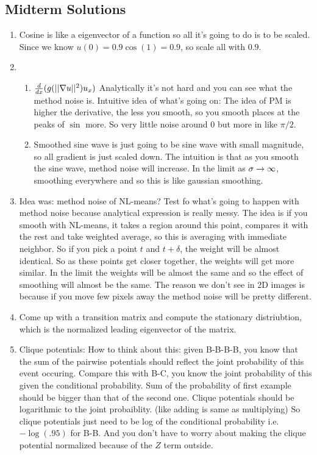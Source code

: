 \subsection{Midterm Solutions}
\label{sec:midterm-solutions}
\begin{enumerate}
\item Cosine is like a eigenvector of a function so all it's going to
  do is to be scaled. Since we know $u(0) = 0.9\cos(1) = 0.9$, so
  scale all with 0.9.
\item
  \begin{enumerate}
  \item $\frac{d}{dx}(g(||\nabla u||^2) u_x)$ Analytically it's not
  hard and you can see what the method noise is. Intuitive idea of
  what's going on: The idea of PM is higher the derivative, the less
  you smooth, so you smooth places at the peaks of $\sin$ more. So
  very little noise around $0$ but more in like $\pi/2$. 
\item Smoothed sine wave is just going to be sine wave with small
  magnitude, so all gradient is just scaled down. The intuition is
  that as you smooth the sine wave, method noise will increase. In the
  limit as $\sigma \rightarrow \infty$, smoothing everywhere and so this is
  like gaussian smoothing. 
  \end{enumerate}
\item Idea was: method noise of NL-means? Test fo what's going to
  happen with method noise because analytical expression is really
  messy. The idea is if you smooth with NL-means, it takes a region
  around this point, compares it with the rest and take weighted
  average, so this is averaging with immediate neighbor. So if you
  pick a point $t$ and $t+\delta$, the weight will be almost
  identical. So as these points get closer together, the weights will
  get more similar. In the limit the weights will be almost the same
  and so the effect of smoothing will almost be the same. The reason
  we don't see in 2D images is because if you move few pixels away the
  method noise will be pretty different.
\item Come up with a transition matrix and compute the stationary
  distriubtion, which is the normalized leading eigenvector of the matrix.
\item Clique potentials: How to think about this: given B-B-B-B, you
  know that the sum of the pairwise potentials should reflect the
  joint probability of this event occuring. Compare this with B-C, you
  know the joint probability of this given the conditional
  probability. Sum of the probability of first example should be
  bigger than that of the second one. Clique potentials should be
  logarithmic to the joint probaiblity. (like adding is same as
  multiplying) So clique potentials just need to be log of the
  conditional probability i.e. $-\log(.95)$ for B-B. And you don't
  have to worry about making the clique potential normalized because
  of the $Z$ term outside. 


\end{enumerate}
